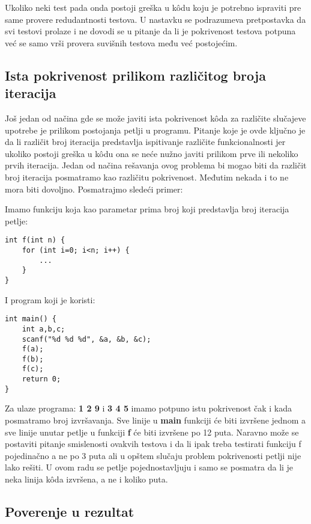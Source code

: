 \documentclass[a4paper]{article}
\begin{document}
Ukoliko neki test pada onda postoji greška u kôdu koju je potrebno ispraviti pre same provere redudantnosti testova. U nastavku se podrazumeva pretpostavka da svi testovi prolaze i ne dovodi se u pitanje da li je pokrivenost testova potpuna već se samo vrši provera suvišnih testova među već postojećim. 

\subsection{Ista pokrivenost prilikom različitog broja iteracija}

Još jedan od načina gde se može javiti ista pokrivenost kôda za različite slučajeve upotrebe je prilikom postojanja petlji u programu. Pitanje koje je ovde ključno je da li različit broj iteracija predstavlja ispitivanje različite funkcionalnosti jer ukoliko postoji greška u kôdu ona se neće nužno javiti prilikom prve ili nekoliko prvih iteracija. Jedan od načina rešavanja ovog problema bi mogao biti da različit broj iteracija posmatramo kao različitu pokrivenost. Međutim nekada i to ne mora biti dovoljno. Posmatrajmo sledeći primer:

Imamo funkciju koja kao parametar prima broj koji predstavlja broj iteracija petlje:

\begin{lstlisting}
int f(int n) {
	for (int i=0; i<n; i++) {
		...
	}
}
\end{lstlisting}

I program koji je koristi:

\begin{lstlisting}
int main() {
	int a,b,c;
	scanf("%d %d %d", &a, &b, &c);
	f(a);
	f(b);
	f(c);
	return 0;
}
\end{lstlisting}

Za ulaze programa: \textbf{1 2 9} i \textbf{3 4 5} imamo potpuno istu pokrivenost čak i kada posmatramo broj izvršavanja. Sve linije u \textbf{main} funkciji će biti izvršene jednom a sve linije unutar petlje u funkciji \textbf{f} će biti izvršene po 12 puta. Naravno može se postaviti pitanje smislenosti ovakvih testova i da li ipak treba testirati funkciju f pojedinačno a ne po 3 puta ali u opštem slučaju problem pokrivenosti petlji nije lako rešiti. U ovom radu se petlje pojednostavljuju i samo se posmatra da li je neka linija kôda izvršena, a ne i koliko puta. 

\subsection{Poverenje u rezultat}
\end{document}
